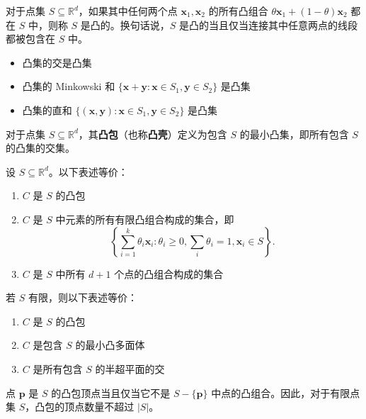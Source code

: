 \begin{definition}[凸集]
    对于点集 $S\subseteq \mathbb R^d$，如果其中任何两个点 $\mathbf x_1,\mathbf x_2$ 的所有凸组合 $\theta \mathbf x_1+(1-\theta)\mathbf x_2$ 都在 $S$ 中，则称 $S$ 是凸的。换句话说，$S$ 是凸的当且仅当连接其中任意两点的线段都被包含在 $S$ 中。
\end{definition}

\begin{property}
    \begin{itemize}
        \item 凸集的交是凸集
        \item 凸集的 Minkowski 和 $\{\mathbf x+\mathbf y:\mathbf x\in S_1,\mathbf y\in S_2\}$ 是凸集
        \item 凸集的直和 $\{(\mathbf x,\mathbf y):\mathbf x\in S_1,\mathbf y\in S_2\}$ 是凸集
    \end{itemize}
\end{property}


\begin{definition}[凸包]
    对于点集 $S\subseteq \mathbb R^d$，其\textbf{凸包}（也称\textbf{凸壳}）定义为包含 $S$ 的最小凸集，即所有包含 $S$ 的凸集的交集。
\end{definition}

\begin{theorem}
    设 $S\subseteq \mathbb R^d$。以下表述等价：
    \begin{enumerate}
        \item $C$ 是 $S$ 的凸包
        \item $C$ 是 $S$ 中元素的所有有限凸组合构成的集合，即
            $$
            \left\{\sum_{i=1}^k \theta_i \mathbf x_i:\theta_i\ge 0,\sum_i \theta_i=1,\mathbf x_i\in S\right\}.
            $$
        \item $C$ 是 $S$ 中所有 $d+1$ 个点的凸组合构成的集合
    \end{enumerate}

    若 $S$ 有限，则以下表述等价：
    \begin{enumerate}
        \item $C$ 是 $S$ 的凸包
        \item $C$ 是包含 $S$ 的最小凸多面体
        \item $C$ 是所有包含 $S$ 的半超平面的交
    \end{enumerate}
\end{theorem}

\begin{fact}
    点 $\mathbf{p}$ 是 $S$ 的凸包顶点当且仅当它不是 $S-\{\mathbf p\}$ 中点的凸组合。因此，对于有限点集 $S$，凸包的顶点数量不超过 $|S|$。
\end{fact}

